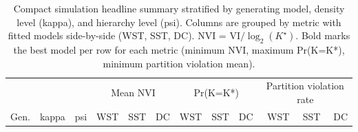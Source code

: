 \begin{table}[!h]
\centering
\caption{Compact simulation headline summary stratified by generating model, density level (kappa), and hierarchy level (psi). Columns are grouped by metric with fitted models side-by-side (WST, SST, DC). NVI = VI$/\log_2(K^\star)$. Bold marks the best model per row for each metric (minimum NVI, maximum Pr(K=K*), minimum partition violation mean).\\\label{tab:sim-headline-compact}}
\centering
\begin{tabular}[t]{lrrrrrrrrrrr}
\toprule
\multicolumn{3}{c}{ } & \multicolumn{3}{c}{Mean NVI} & \multicolumn{3}{c}{Pr(K=K*)} & \multicolumn{3}{c}{Partition violation rate} \\
\cmidrule(l{3pt}r{3pt}){4-6} \cmidrule(l{3pt}r{3pt}){7-9} \cmidrule(l{3pt}r{3pt}){10-12}
Gen. & kappa & psi & WST & SST & DC & WST & SST & DC & WST & SST & DC\\


\bottomrule
\end{tabular}
\end{table}
